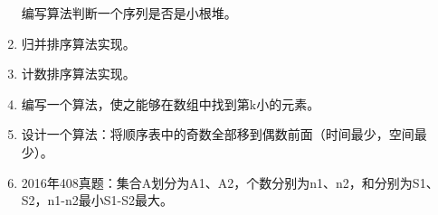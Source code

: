 \documentclass[lang=cn,newtx,10pt,scheme=chinese]{../../elegantbook}
\begin{document}
\begin{enumerate}
  编写算法判断一个序列是否是小根堆。
  
\vspace{5cm}
\item
  
  归并排序算法实现。
  
\vspace{5cm}
\item
  
  计数排序算法实现。
  
\vspace{5cm}
\item
  
  编写一个算法，使之能够在数组中找到第k小的元素。
  
\vspace{5cm}
\item
  
  设计一个算法：将顺序表中的奇数全部移到偶数前面（时间最少，空间最少）。
  
\vspace{5cm}
\item
  
  2016年408真题：集合A划分为A1、A2，个数分别为n1、n2，和分别为S1、S2，\textbar n1-n2\textbar 最小\textbar S1-S2\textbar 最大。
  
\end{enumerate}
\end{document}
